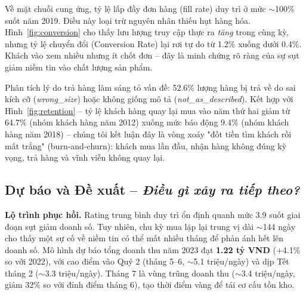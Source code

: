 \documentclass{article}
\begin{document}
Về mặt chuỗi cung ứng, tỷ lệ lấp đầy đơn hàng (fill rate) duy trì
ở mức $\sim$100\% suốt năm 2019. Điều này loại trừ nguyên nhân thiếu hụt hàng hóa. 
Hình~\ref{fig:conversion} cho thấy lưu lượng truy cập thực ra
\emph{tăng} trong cùng kỳ, nhưng tỷ lệ chuyển đổi (Conversion Rate) lại rơi tự do từ 1.2\% xuống dưới 0.4\%.
Khách vào xem nhiều nhưng ít chốt đơn -- đây là minh chứng rõ ràng của sự sụt giảm niềm tin
vào chất lượng sản phẩm.

Phân tích lý do trả hàng làm sáng tỏ vấn đề: 52.6\% lượng hàng bị trả về do
sai kích cỡ (\textit{wrong\_size}) hoặc không giống mô tả (\textit{not\_as\_described}). Kết hợp với
Hình~\ref{fig:retention} -- tỷ lệ khách hàng quay lại mua vào năm thứ hai giảm từ 64.7\% (nhóm khách hàng năm 2012)
xuống mức báo động 9.4\% (nhóm khách hàng năm 2018) -- chúng tôi kết luận đây
là vòng xoáy "đốt tiền tìm khách rồi mất trắng" (burn-and-churn): khách mua lần đầu, nhận hàng
không đúng kỳ vọng, trả hàng và vĩnh viễn không quay lại.

\subsection{Dự báo và Đề xuất -- \textit{Điều gì xảy ra tiếp theo?}}

\textbf{Lộ trình phục hồi.}
Rating trung bình duy trì ổn định quanh mức 3.9 suốt giai đoạn sụt giảm doanh số. Tuy nhiên, chu kỳ mua lặp lại trung vị dài $\sim$144 ngày cho thấy một sự cố về niềm tin có thể mất nhiều tháng để phản ánh hết lên doanh số.
Mô hình dự báo tổng doanh thu năm 2023 đạt \textbf{1.22 tỷ VND} ($+$4.1\% so với 2022),
với cao điểm vào Quý 2 (tháng 5--6, $\sim$5.1 triệu/ngày) và dịp Tết tháng 2 ($\sim$3.3 triệu/ngày).
Tháng 7 là vùng trũng doanh thu ($\sim$3.4 triệu/ngày, giảm 32\% so với đỉnh điểm tháng 6),
tạo thời điểm vàng để tái cơ cấu tồn kho.
\end{document}
